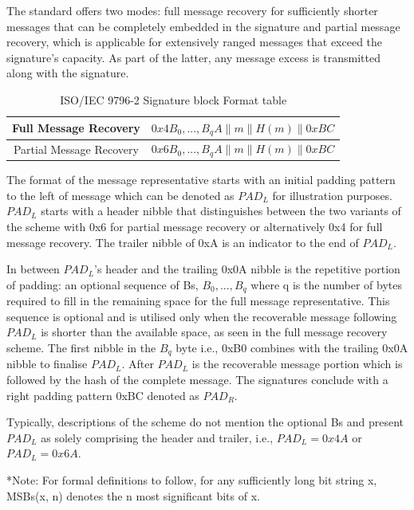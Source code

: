 \documentclass[]{final_report}
\theoremstyle{definition}
\begin{document}
The standard offers two modes: full message recovery for sufficiently shorter messages that can be completely embedded in the signature and partial message recovery, which is applicable for extensively ranged messages that exceed the signature's capacity. As part of the latter, any message excess is transmitted along with the signature.

\begin{table}[H]
    \centering
    \caption{ISO/IEC 9796-2 Signature block Format table}
    \begin{tabular}{|c|c|}
    \hline
    Full Message Recovery & $0x4B_{0},...,B_{q}A\|m\|H(m)\|0xBC$ \\
    \hline
    Partial Message Recovery & $0x6B_{0},...,B_{q}A\|m\|H(m)\|0xBC$ \\
    \hline
    \end{tabular}
    \label{tab:sig_block_tab}
\end{table}

The format of the message representative starts with an initial padding pattern to the left of message which can be denoted as $PAD_L$ for illustration purposes. $PAD_L$ starts with a header nibble that distinguishes between the two variants of the scheme with 0x6 for partial message recovery or alternatively 0x4 for full message recovery. The trailer nibble of 0xA is an indicator to the end of $PAD_L$. 

In between $PAD_L$'s header and the trailing 0x0A nibble is the repetitive portion of padding: an optional sequence of Bs, $B_{0},...,B_{q}$ where q is the number of bytes required to fill in the remaining space for the full message representative. This sequence is optional and is utilised only when the recoverable message following $PAD_L$ is shorter than the available space, as seen in the full message recovery scheme. The first nibble in the $B_{q}$ byte i.e., 0xB0 combines with the trailing 0x0A nibble to finalise $PAD_L$.
After $PAD_L$ is the recoverable message portion which is followed by the hash of the complete message. The signatures conclude with a right padding pattern 0xBC denoted as $PAD_R$.

Typically, descriptions of the scheme do not mention the optional Bs and present $PAD_L$ as solely comprising the header and trailer, i.e., $PAD_L = 0x4A$ or $PAD_L = 0x6A$.

*Note: For formal definitions to follow, for any sufficiently long bit string x, MSBs(x, n) denotes the n most significant bits of x.
\end{document}
